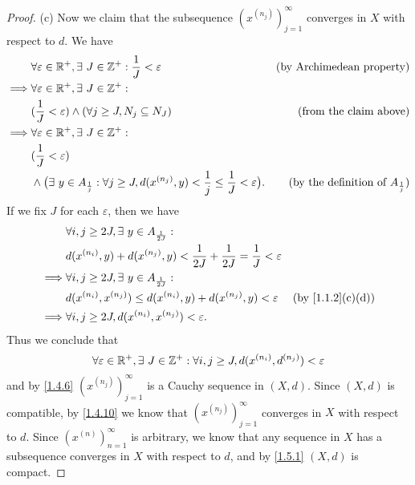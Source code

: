 \begin{proof}{(c)}
  Now we claim that the subsequence \((x^{(n_j)})_{j = 1}^\infty\) converges in \(X\) with respect to \(d\).
  We have
  \begin{align*}
             & \forall \varepsilon \in \mathbb{R}^+, \exists\ J \in \mathbb{Z}^+ : \frac{1}{J} < \varepsilon                                                    & \text{(by Archimedean property)}                  \\
    \implies & \forall \varepsilon \in \mathbb{R}^+, \exists\ J \in \mathbb{Z}^+ :                                                                                                                                  \\
             & (\frac{1}{J} < \varepsilon) \land (\forall j \geq J, N_j \subseteq N_J)                                                          & \text{(from the claim above)}                     \\
    \implies & \forall \varepsilon \in \mathbb{R}^+, \exists\ J \in \mathbb{Z}^+ :                                                                                                                                  \\
             & (\frac{1}{J} < \varepsilon)                                                                                                                                                          \\
             & \land \big(\exists\ y \in A_{\frac{1}{j}} : \forall j \geq J, d(x^{(n_j)}, y) < \frac{1}{j} \leq \frac{1}{J} < \varepsilon\big). & \text{(by the definition of \(A_{\frac{1}{j}}\))}
  \end{align*}
  If we fix \(J\) for each \(\varepsilon\), then we have
  \begin{align*}
             & \forall i, j \geq 2J, \exists\ y \in A_{\frac{1}{2J}} :                                                                      \\
             & d(x^{(n_i)}, y) + d(x^{(n_j)}, y) < \frac{1}{2J} + \frac{1}{2J} = \frac{1}{J} < \varepsilon                                  \\
    \implies & \forall i, j \geq 2J, \exists\ y \in A_{\frac{1}{2J}} :                                                                      \\
             & d(x^{(n_i)}, x^{(n_j)}) \leq d(x^{(n_i)}, y) + d(x^{(n_j)}, y) < \varepsilon                & \text{(by \cref{1.1.2}(c)(d))} \\
    \implies & \forall i, j \geq 2J, d(x^{(n_i)}, x^{(n_j)}) < \varepsilon.
  \end{align*}
  Thus we conclude that
  \[
    \forall \varepsilon \in \mathbb{R}^+, \exists\ J \in \mathbb{Z}^+ : \forall i, j \geq J, d(x^{(n_i)}, d^{(n_j)}) < \varepsilon
  \]
  and by \cref{1.4.6} \((x^{(n_j)})_{j = 1}^\infty\) is a Cauchy sequence in \((X, d)\).
  Since \((X, d)\) is compatible, by \cref{1.4.10} we know that \((x^{(n_j)})_{j = 1}^\infty\) converges in \(X\) with respect to \(d\).
  Since \((x^{(n)})_{n = 1}^\infty\) is arbitrary, we know that any sequence in \(X\) has a subsequence converges in \(X\) with respect to \(d\), and by \cref{1.5.1} \((X, d)\) is compact.
\end{proof}

